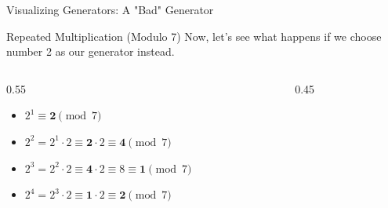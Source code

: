 \documentclass[aspectratio=169, 10pt]{beamer}
\begin{document}
\begin{frame}{Visualizing Generators: A "Bad" Generator}
    
    \begin{block}{Repeated Multiplication (Modulo 7)}
        Now, let's see what happens if we choose number 2 as our generator instead.
    \end{block}

    \vspace{0.3cm}
    \begin{columns}[c]
        \begin{column}{0.55\textwidth}
            \begin{itemize}
                \item<1-> $2^1 \equiv \mathbf{2} \pmod 7$
                \vspace{0.1cm}
                \item<2-> $2^2 = 2^1 \cdot 2 \equiv \mathbf{2} \cdot 2 \equiv \mathbf{4} \pmod 7$
                \vspace{0.1cm}
                \item<3-> $2^3 = 2^2 \cdot 2 \equiv \mathbf{4} \cdot 2 \equiv 8 \equiv \mathbf{1} \pmod 7$
                \vspace{0.1cm}
                \item<4-> $2^4 = 2^3 \cdot 2 \equiv \mathbf{1} \cdot 2 \equiv \mathbf{2} \pmod 7$
            \end{itemize}
        \end{column}

        \begin{column}{0.45\textwidth}
            \centering
\end{column}
\end{columns}
\end{frame}
\end{document}

